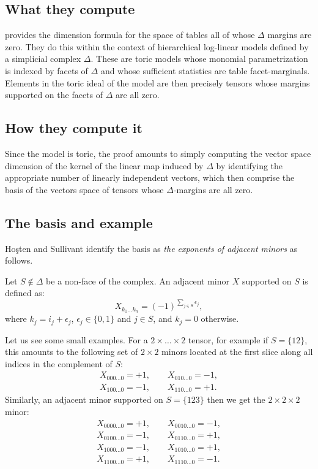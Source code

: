 \documentclass[12pt]{extarticle}
\theoremstyle{definition}
\numberwithin{theorem}{section}
\begin{document}
\subsection*{What they compute} 
\cite[Theorem 2.6]{HoSu02} provides the dimension formula for the space of tables all of whose $\Delta$ margins are zero. %
They do this within the context of hierarchical log-linear models defined by a simplicial complex $\Delta$. These are toric models whose monomial parametrization is indexed by facets of $\Delta$ and whose sufficient statistics are table facet-marginals. Elements in the toric ideal of the model are then precisely tensors whose  margins supported on the facets of $\Delta$ are all zero. 

\subsection*{How they compute it}
Since the model is toric, the proof amounts to simply computing the vector space dimension of the kernel of the linear map induced by $\Delta$ by identifying the appropriate number of linearly independent vectors, which then comprise the basis of the vectors space of tensors whose $\Delta$-margins are all zero.  

\subsection*{The basis and example} 
Ho\c{s}ten and Sullivant identify  the basis as \emph{the exponents of adjacent minors}  as follows. 

Let $S\not\in\Delta$ be a non-face of the complex. An adjacent minor $X$ supported on $S$ is defined as: 
\[
	X_{k_1\dots k_n} =(-1)^{\sum_{j\in S}\epsilon_j}, 
\]
where $k_j=i_j+\epsilon_j$, $\epsilon_j\in\{0,1\}$ and $j\in S$, and $k_j=0$ otherwise.


Let us see some small examples. 
For a $2\times\dots\times2$ tensor, for example if $S=\{12\}$, this amounts to the following set of  $2\times 2$ minors
 located at the  first slice along all indices in the complement of $S$: 
\begin{align*}
	X_{000\dots0} = +1, \qquad X_{010\dots0} =-1,\\ 
	X_{100\dots0} =-1, \qquad 	X_{110\dots0}  =+1.
\end{align*}
Similarly, an adjacent minor supported on $S=\{123\}$ then we get the $2\times2\times2$ minor: 
\begin{align*}
	X_{0000\dots0} = +1, \qquad X_{0010\dots0} =-1,\\ 
	X_{0100\dots0} = -1, \qquad X_{0110\dots0} =+1,\\ 
	X_{1000\dots0} = -1, \qquad X_{1010\dots0} =+1,\\ 	
	X_{1100\dots0} =+1, \qquad 	X_{1110\dots0}  =-1.
\end{align*}
\end{document}
